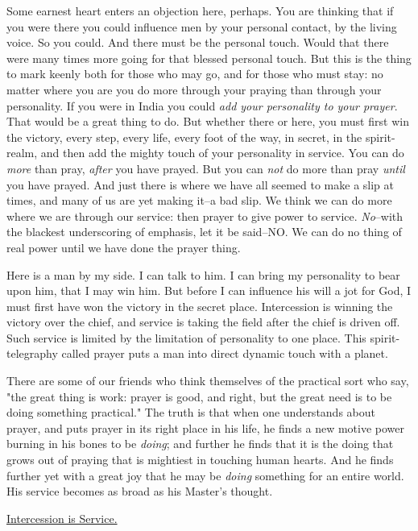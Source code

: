 Some earnest heart enters an objection here, perhaps. You are thinking
that if you were there you could influence men by your personal contact,
by the living voice. So you could. And there must be the personal touch.
Would that there were many times more going for that blessed personal
touch. But this is the thing to mark keenly both for those who may go, and
for those who must stay: no matter where you are you do more through your
praying than through your personality. If you were in India you could \textit{add
your personality to your prayer}. That would be a great thing to do. But
whether there or here, you must first win the victory, every step, every
life, every foot of the way, in secret, in the spirit-realm, and then add
the mighty touch of your personality in service. You can do \textit{more} than
pray, \textit{after} you have prayed. But you can \textit{not} do more than pray \textit{until}
you have prayed. And just there is where we have all seemed to make a
slip at times, and many of us are yet making it--a bad slip. We think we
can do more where we are through our service: then prayer to give power to
service. \textit{No}--with the blackest underscoring of emphasis, let it be
said--NO. We can do no thing of real power until we have done the prayer
thing.

Here is a man by my side. I can talk to him. I can bring my personality to
bear upon him, that I may win him. But before I can influence his will a
jot for God, I must first have won the victory in the secret place.
Intercession is winning the victory over the chief, and service is taking
the field after the chief is driven off. Such service is limited by the
limitation of personality to one place. This spirit-telegraphy called
prayer puts a man into direct dynamic touch with a planet.

There are some of our friends who think themselves of the practical sort
who say, "the great thing is work: prayer is good, and right, but the
great need is to be doing something practical." The truth is that when one
understands about prayer, and puts prayer in its right place in his life,
he finds a new motive power burning in his bones to be \textit{doing}; and
further he finds that it is the doing that grows out of praying that is
mightiest in touching human hearts. And he finds further yet with a great
joy that he may be \textit{doing} something for an entire world. His service
becomes as broad as his Master's thought.



\underline{Intercession is Service.}


